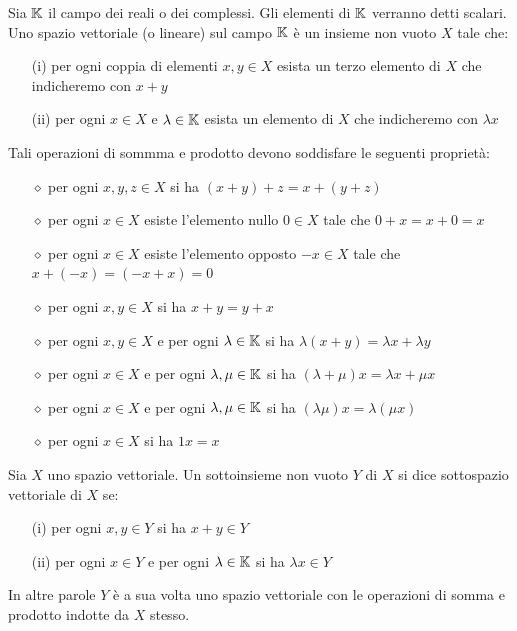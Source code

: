 \begin{defn}
Sia $\mathbb{K}$ il campo dei reali o dei complessi. Gli elementi di $\mathbb{K}$ verranno detti scalari. Uno spazio vettoriale (o lineare) sul campo $\mathbb{K}$ è un insieme non vuoto $X$ tale che:
\begin{enumerate}
    \item [(i)] per ogni coppia di elementi $x,y\in X$ esista un terzo elemento di $X$ che indicheremo con $x+y$
    \item [(ii)] per ogni $x\in X$ e $\lambda \in \mathbb{K}$ esista un elemento di $X$ che indicheremo con $\lambda x$
\end{enumerate}
Tali operazioni di sommma e prodotto devono soddisfare le seguenti proprietà:
\begin{enumerate}
    \item [$\diamond$] per ogni $x,y,z\in X$ si ha $(x+y)+z=x+(y+z)$
    \item [$\diamond$] per ogni $x\in X$ esiste l'elemento nullo $0\in X$ tale che $0+x=x+0=x$
    \item [$\diamond$] per ogni $x\in X$ esiste l'elemento opposto $-x\in X$ tale che $x+(-x)=(-x+x)=0$
    \item [$\diamond$] per ogni $x,y\in X$ si ha $x+y=y+x$
    \item [$\diamond$] per ogni $x,y\in X$ e per ogni $\lambda\in\mathbb{K}$ si ha $\lambda(x+y)=\lambda x+\lambda y$
    \item [$\diamond$] per ogni $x\in X$ e per ogni $\lambda,\mu\in\mathbb{K}$ si ha $(\lambda+\mu)x=\lambda x +\mu x$
    \item [$\diamond$] per ogni $x\in X$ e per ogni $\lambda,\mu\in\mathbb{K}$ si ha $(\lambda \mu)x=\lambda(\mu x)$
    \item [$\diamond$] per ogni $x\in X$ si ha $1x=x$
\end{enumerate}
\end{defn}

\begin{defn}
Sia $X$ uno spazio vettoriale. Un sottoinsieme non vuoto $Y$ di $X$ si dice sottospazio vettoriale di $X$ se:
\begin{enumerate}
    \item [(i)] per ogni $x,y\in Y$ si ha $x+y\in Y$
    \item [(ii)] per ogni $x\in Y$ e per ogni $\lambda\in\mathbb{K}$ si ha $\lambda x\in Y$
\end{enumerate}
\end{defn}
In altre parole $Y$ è a sua volta uno spazio vettoriale con le operazioni di somma e prodotto indotte da $X$ stesso.

